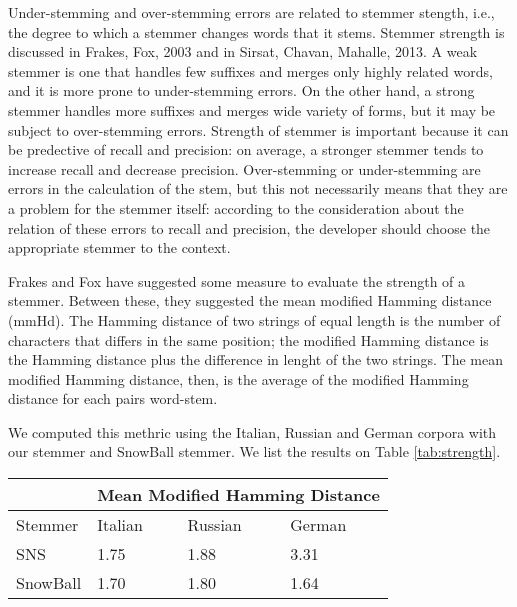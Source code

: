 Under-stemming and over-stemming errors are related to stemmer stength, i.e., the degree to which a stemmer changes words that it stems. Stemmer strength is discussed in Frakes, Fox, 2003\cite{frakes} and in Sirsat, Chavan, Mahalle, 2013\cite{sirsat}.
A weak stemmer is one that handles few suffixes and merges only highly related words, and it is more prone to under-stemming errors.
On the other hand, a strong stemmer handles more suffixes and merges wide variety of forms, but it may be subject to over-stemming errors. Strength of stemmer is important because it can be predective of recall and precision: on average, a stronger stemmer tends to increase recall and decrease precision.
Over-stemming or under-stemming are errors in the calculation of the stem, but this not necessarily means that they are a problem for the stemmer itself: according to the consideration about the relation of these errors to recall and precision, the developer should choose the appropriate stemmer to the context. 

Frakes and Fox have suggested some measure to evaluate the strength of a stemmer. Between these, they suggested the mean modified Hamming distance (mmHd). The Hamming distance of two strings of equal length is the number of characters that differs in the same position; the modified Hamming distance is the Hamming distance plus the difference in lenght of the two strings. The mean modified Hamming distance, then, is the average of the modified Hamming distance for each pairs word-stem.

We computed this methric using the Italian, Russian and German corpora with our stemmer and SnowBall stemmer. We list the results on Table \ref{tab:strength}.

\begin{center}
   \begin{tabular}{| l | l | l | l |}
    \hline
    & \multicolumn{3}{l|}{\textbf{Mean Modified Hamming Distance}}\\ \hline
    Stemmer & Italian & Russian & German\\ \hline
    SNS & 1.75 & 1.88 & 3.31 \\ \hline
    SnowBall & 1.70 & 1.80 & 1.64\\ \hline    
    \end{tabular}
    \label{tab:strength}
\end{center}

